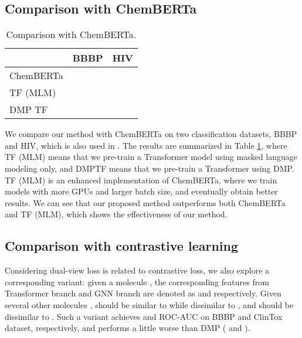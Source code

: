 \documentclass{article}
\newcommand{\ourM}{DMP}
\begin{document}
\subsection{Comparison with ChemBERTa \citep{chithrananda2020chemberta}}\label{appendix:chemberta}
\begin{table}[!htb]
    \centering
    \begin{tabular}{lcc}
    \toprule
    & BBBP &HIV \\
    \midrule
      ChemBERTa &  &  \\
      TF (MLM) &  &  \\
      \ourM{} TF &  & \\
      \bottomrule
    \end{tabular}
    \caption{Comparison with ChemBERTa.}
    \label{tab:comwithchemberta}
\end{table}
We compare our method with ChemBERTa \citep{chithrananda2020chemberta} on two classification datasets, BBBP and HIV, which is also used in \citep{chithrananda2020chemberta}.
The results are summarized in Table \ref{tab:comwithchemberta}, where TF (MLM) means that we pre-train a Transformer model using masked language modeling only, and \ourM{}TF means that we pre-train a Transformer using \ourM{}. TF (MLM) is an enhanced implementation of ChemBERTa, where we train models with more GPUs and larger batch size, and eventually obtain better results.
We can see that our proposed method  outperforms both ChemBERTa and TF (MLM), which shows the effectiveness of our method.




\subsection{Comparison with contrastive learning}\label{appendix:contrastive} Considering dual-view loss is related to contrastive loss, we also explore a corresponding variant: given a molecule , the corresponding features from Transformer branch and GNN branch are denoted as  and  respectively. Given several other molecules ,  should be similar to  while dissimilar to , and  should be dissimilar to . Such a variant achieves  and  ROC-AUC on BBBP and ClinTox dataset, respectively, and performs a little worse than \ourM{} ( and ).
\end{document}
